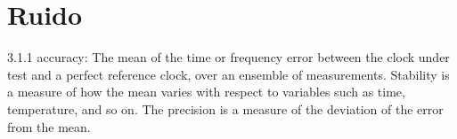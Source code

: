 \chapter{Ruido}


3.1.1 accuracy: The mean of the time or frequency error between the clock under 
test and a perfect
reference clock, over an ensemble of measurements. Stability is a measure of 
how the mean varies with
respect to variables such as time, temperature, and so on. The precision is a 
measure of the deviation of the
error from the mean.
